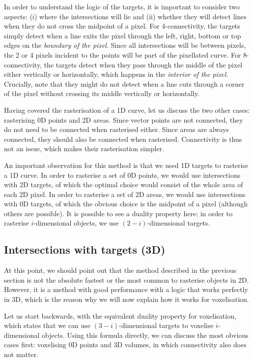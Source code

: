In order to understand the logic of the targets, it is important to consider two aspects: (i) where the intersections will lie and (ii) whether they will detect lines when they do not cross the midpoint of a pixel.
For 4-connectivity, the targets simply detect when a line exits the pixel through the left, right, bottom or top edges on the \emph{boundary of the pixel}.
Since all intersections will be between pixels, the 2 or 4 pixels incident to the points will be part of the pixellated curve.
For 8-connectivity, the targets detect when they pass through the middle of the pixel either vertically or horizontally, which happens in the \emph{interior of the pixel}.
Crucially, note that they might do not detect when a line cuts through a corner of the pixel without crossing its middle vertically or horizontally.

Having covered the rasterisation of a 1D curve, let us discuss the two other cases: rasterising 0D points and 2D areas.
Since vector points are not connected, they do not need to be connected when rasterised either.
Since areas are always connected, they should also be connected when rasterised.
Connectivity is thus not an issue, which makes their rasterisation simpler.

An important observation for this method is that we used 1D targets to rasterise a 1D curve.
In order to rasterise a set of 0D points, we would use intersections with 2D targets, of which the optimal choice would consist of the whole area of each 2D pixel.
In order to rasterise a set of 2D areas, we would use intersections with 0D targets, of which the obvious choice is the midpoint of a pixel (although others are possible).
It is possible to see a duality property here: in order to rasterise \(i\)-dimensional objects, we use \((2-i)\)-dimensional targets.

\subsection{Intersections with targets (3D)}

At this point, we should point out that the method described in the previous section is not the absolute fastest or the most common to rasterise objects in 2D.
However, it is a method with good performance with a logic that works perfectly in 3D, which is the reason why we will now explain how it works for voxelisation.

Let us start backwards, with the equivalent duality property for voxelisation, which states that we can use \((3-i)\)-dimensional targets to voxelise \(i\)-dimensional objects.
Using this formula directly, we can discuss the most obvious cases first: voxelising 0D points and 3D volumes, in which connectivity also does not matter.

